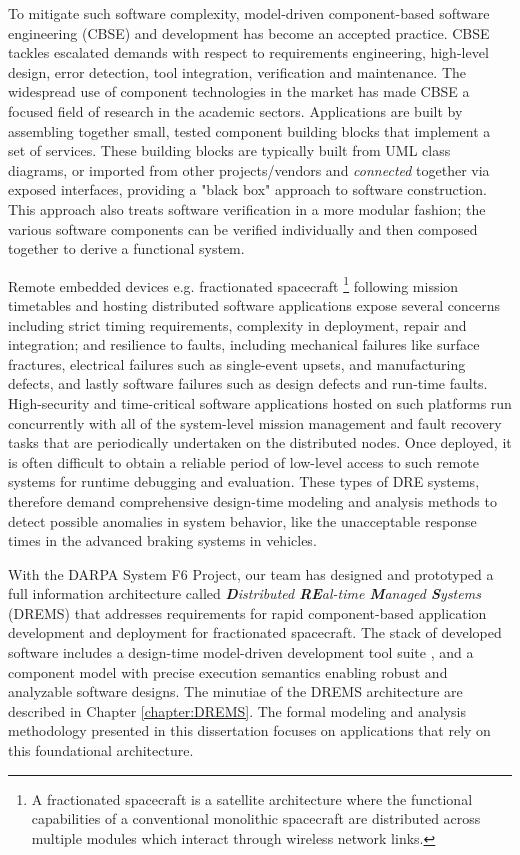 To mitigate such software complexity, model-driven component-based software engineering (CBSE) and development \cite{beydeda2005model, heineman2001component, clemens1998component, simulink1993mathworks, autosar} has become an accepted practice. CBSE tackles escalated demands with respect to requirements engineering, high-level design, error detection, tool integration, verification and maintenance. The widespread use of component technologies in the market has made CBSE a focused field of research in the academic sectors. Applications are built by assembling together small, tested component building blocks that implement a set of services. These building blocks are typically built from UML \cite{UML} class diagrams, or imported from other projects/vendors and \emph{connected} together via exposed interfaces, providing a "black box" approach to software construction. This approach also treats software verification in a more modular fashion; the various software components can be verified individually and then composed together to derive a functional system. 

Remote embedded devices e.g. fractionated spacecraft \footnote{A fractionated spacecraft is a satellite architecture where the functional capabilities of a conventional monolithic spacecraft are distributed across multiple modules which interact through wireless network links.} following mission timetables and hosting distributed software applications expose several concerns including strict timing requirements, complexity in deployment, repair and integration; and resilience to faults, including mechanical failures like surface fractures, electrical failures such as single-event upsets, and manufacturing defects, and lastly software failures such as design defects and run-time faults. High-security and time-critical software applications hosted on such platforms run concurrently with all of the system-level mission management and fault recovery tasks that are periodically undertaken on the distributed nodes. Once deployed, it is often difficult to obtain a reliable period of low-level access to such remote systems for runtime debugging and evaluation. These types of DRE systems, therefore demand comprehensive design-time modeling and analysis methods to detect possible anomalies in system behavior, like the unacceptable response times in the advanced braking systems in vehicles. 

With the DARPA System F6 Project, our team has designed and prototyped a full information architecture called \emph{\textbf{D}istributed \textbf{RE}al-time \textbf{M}anaged \textbf{S}ystems} (DREMS) \cite{ISIS_F6_Aerospace:12,DREMS13Software} that addresses requirements for rapid component-based application development and deployment for fractionated spacecraft. The stack of developed software includes a  design-time model-driven development tool suite \cite{ISIS_F6_SFFMT:13}, and a component model \cite{ISIS_F6_ISORC:13} with precise execution semantics enabling robust and analyzable software designs. The minutiae of the DREMS architecture are described in Chapter \ref{chapter:DREMS}. The formal modeling and analysis methodology presented in this dissertation focuses on applications that rely on this foundational architecture. 

